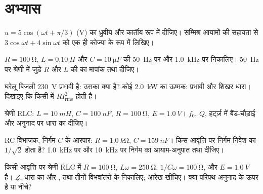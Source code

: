 \section{अभ्यास}

\begin{exercise}[$\star$]\label{exo:b1:sinusoidal-impedance:1}
$u = 5\cos(\omega t + \pi/3)$ (V) का  ध्रुवीय और कार्तीय रूप
में दीजिए। सम्मिश्र आयामों की सहायता से $3\cos\omega t
+ 4\sin\omega t$ को एक ही कोज्या के रूप में लिखिए।
\end{exercise}

\begin{exercise}[$\star$]\label{exo:b1:sinusoidal-impedance:2}
$R = \qty{100}{\ohm}$, $L = \qty{0.10}{H}$ और
$C = \qty{10}{\micro F}$ की  \qty{50}{Hz} पर और \qty{1.0}{kHz} पर
निकालिए। \qty{50}{Hz} पर श्रेणी में जुड़े $R$ और $L$ की  का
मापांक तथा  दीजिए।
\end{exercise}

\begin{exercise}[$\star$]\label{exo:b1:sinusoidal-impedance:3}
घरेलू बिजली \qty{230}{V} प्रभावी है: उसका  क्या है? कोई \qty{2.0}{kW}
का ऊष्मक: प्रभावी और शिखर धारा। दिखाइए कि किसी  में 
$RI_{\mathrm{rms}}^2$ होती है।
\end{exercise}

\begin{exercise}[$\star$]\label{exo:b1:sinusoidal-impedance:4}
श्रेणी RLC: $L = \qty{10}{mH}$, $C = \qty{100}{nF}$, $R = \qty{100}{\ohm}$,
$E = \qty{1.0}{V}$। $f_0$, $Q$, हर्ट्ज़ में बैंड-चौड़ाई और अनुनाद पर धारा का
 दीजिए।
\end{exercise}

\begin{exercise}[$\star\star$]\label{exo:b1:sinusoidal-impedance:5}
RC विभाजक, निर्गम $C$ के आरपार: $R = \qty{1.0}{k\ohm}$, $C = \qty{159}{nF}$।
किस आवृत्ति पर निर्गम निवेश का $1/\sqrt2$ होता है? \qty{1.0}{kHz} पर और
\qty{10}{kHz} पर निर्गम का आयाम-अनुपात तथा  दीजिए।
\end{exercise}

\begin{exercise}[$\star\star$]\label{exo:b1:sinusoidal-impedance:6}
किसी आवृत्ति पर श्रेणी RLC में $R = \qty{100}{\ohm}$, $L\omega =
\qty{250}{\ohm}$, $1/C\omega = \qty{100}{\ohm}$, और $E = \qty{1.0}{V}$ है।
$\underline Z$, धारा का  और , तथा तीनों
विभवांतरों के  निकालिए;  आरेख खींचिए। क्या परिपथ अनुनाद के ऊपर है
या नीचे?
\end{exercise}


